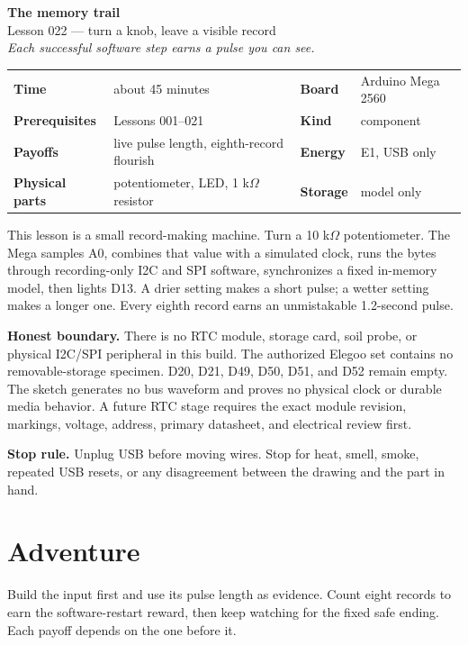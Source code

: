 \documentclass[11pt]{article}
\begin{document}
\begin{center}
{\Huge\bfseries The memory trail}\\[4pt]
{\Large Lesson 022 --- turn a knob, leave a visible record}\\[6pt]
\textit{Each successful software step earns a pulse you can see.}
\end{center}

\begin{tabularx}{\linewidth}{@{}>{\bfseries}lX>{\bfseries}lX@{}}
Time & about 45 minutes & Board & Arduino Mega 2560\\
Prerequisites & Lessons 001--021 & Kind & component\\
Payoffs & live pulse length, eighth-record flourish & Energy & E1, USB only\\
Physical parts & potentiometer, LED, 1 k\(\Omega\) resistor & Storage & model only\\
\end{tabularx}

This lesson is a small record-making machine. Turn a 10 k\(\Omega\)
potentiometer. The Mega samples A0, combines that value with a simulated clock,
runs the bytes through recording-only I2C and SPI software, synchronizes a
fixed in-memory model, then lights D13. A drier setting makes a short pulse; a
wetter setting makes a longer one. Every eighth record earns an unmistakable
1.2-second pulse.

\textbf{Honest boundary.} There is no RTC module, storage card, soil probe, or
physical I2C/SPI peripheral in this build. The authorized Elegoo set contains
no removable-storage specimen. D20, D21, D49, D50, D51, and D52 remain empty.
The sketch generates no bus waveform and proves no physical clock or durable
media behavior. A future RTC stage requires the exact module revision,
markings, voltage, address, primary datasheet, and electrical review first.

\textbf{Stop rule.} Unplug USB before moving wires. Stop for heat, smell,
smoke, repeated USB resets, or any disagreement between the drawing and the
part in hand.

\section*{Adventure}

Build the input first and use its pulse length as evidence. Count eight
records to earn the software-restart reward, then keep watching for the fixed
safe ending. Each payoff depends on the one before it.
\end{document}
